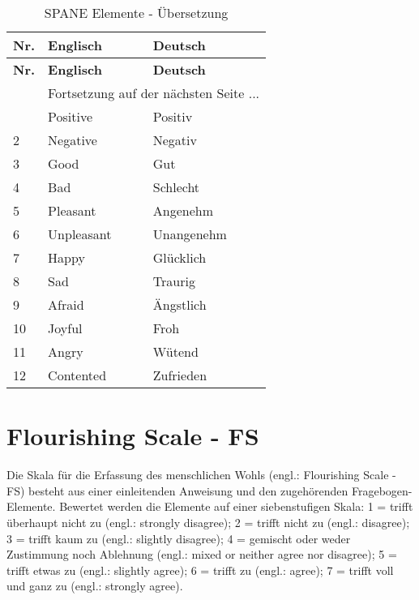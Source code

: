 \begin{RaggedRight}
\begin{center}
    \begin{longtable}[t]{|p{0.8 cm}|p{6.6 cm}|p{6.6 cm}|}
    \caption{SPANE Elemente - Übersetzung} \\ \hline
        \textbf{Nr.} & \textbf{Englisch} & \textbf{Deutsch} \\ \hline
        \endfirsthead
        \hline
        \textbf{Nr.} & \textbf{Englisch} & \textbf{Deutsch} \\ \hline
        \endhead 
        & \multicolumn{2}{|c|}{Fortsetzung auf der nächsten Seite $...$ } \\ \hline
        \endfoot
        \hline
        \endlastfoot
        1 & Positive & Positiv\\
        2 & Negative & Negativ\\
        3 & Good & Gut\\
        4 & Bad & Schlecht\\
        5 & Pleasant & Angenehm\\
        6 & Unpleasant & Unangenehm\\
        7 & Happy & Glücklich\\
        8 & Sad & Traurig\\
        9 & Afraid & Ängstlich\\
        10 & Joyful & Froh\\
        11 & Angry & Wütend\\
        12 & Contented & Zufrieden\\  
    \end{longtable}
	\label{tab:SpaneElemente}
\end{center}

\section{Flourishing Scale - FS}\label{appendix.fs}
Die Skala für die Erfassung des menschlichen Wohls (engl.: Flourishing Scale - FS) \cite{Diener:2010} besteht aus einer einleitenden Anweisung und den zugehörenden Fragebogen-Elemente. Bewertet werden die Elemente auf einer siebenstufigen Skala: 1 = trifft überhaupt nicht zu (engl.: strongly disagree); 2 = trifft nicht zu (engl.: disagree); 3 = trifft kaum zu (engl.: slightly disagree); 4 = gemischt oder weder Zustimmung noch Ablehnung (engl.: mixed or neither agree nor disagree); 5 = trifft etwas zu (engl.: slightly agree); 6 = trifft zu (engl.: agree); 7 = trifft voll und ganz zu (engl.: strongly agree).


\end{RaggedRight}
